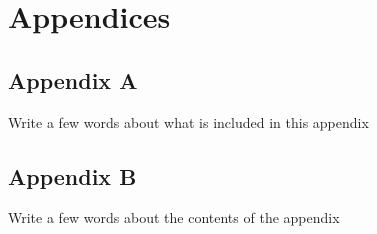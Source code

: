 \chapter*{Appendices}

\section*{Appendix A}
Write a few words about what is included in this appendix

\newpage
\section*{Appendix B}
Write a few words about the contents of the appendix
